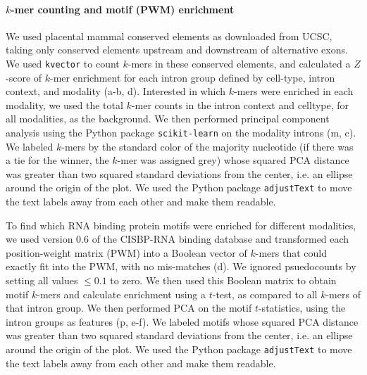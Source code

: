 \paragraph{$k$-mer counting and motif (PWM) enrichment}
We used placental mammal conserved elements as downloaded from UCSC\cite{Rosenbloom:2015bg}, taking only conserved elements upstream and downstream of alternative exons. We used \texttt{kvector}\cite{Anonymous:kvector} to count $k$-mers in these conserved elements, and calculated a $Z$-score of $k$-mer enrichment for each intron group defined by cell-type, intron context, and modality (a-b, d). Interested in which $k$-mers were enriched in each modality, we used the total $k$-mer counts in the intron context and celltype, for all modalities, as the background. We then performed principal component analysis using the Python package \texttt{scikit-learn} \cite{Pedregosa:2011tv} on the modality introns (m, c). We labeled $k$-mers by the standard color of the majority nucleotide (if there was a tie for the winner, the $k$-mer was assigned grey) whose squared PCA distance was greater than two squared standard deviations from the center, i.e. an ellipse around the origin of the plot. We used the Python package \texttt{adjustText}\cite{Anonymous:adjustText} to move the text labels away from each other and make them readable.

To find which RNA binding protein motifs were enriched for different modalities, we used version 0.6 of the CISBP-RNA binding database \cite{Ray:2013br} and transformed each position-weight matrix (PWM) into a Boolean vector of $k$-mers that could exactly fit into the PWM, with no mis-matches (d). We ignored psuedocounts by setting all values $\leq 0.1$ to zero. We then used this Boolean matrix to obtain motif $k$-mers and calculate enrichment using a $t$-test, as compared to all $k$-mers of that intron group. We then performed PCA on the motif $t$-statistics, using the intron groups as features (p, e-f). We labeled motifs whose squared PCA distance was greater than two squared standard deviations from the center, i.e. an ellipse around the origin of the plot. We used the Python package \texttt{adjustText}\cite{Anonymous:adjustText} to move the text labels away from each other and make them readable.


